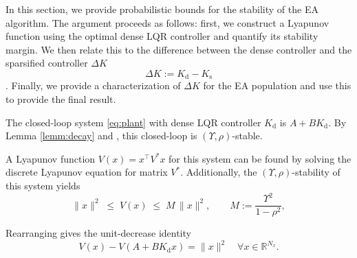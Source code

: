 \documentclass[conference]{IEEEtran}
\begin{document}
In this section, we provide probabilistic bounds for the stability of the EA algorithm. 
The argument proceeds as follows:
first, we construct a Lyapunov function using the optimal dense LQR controller and quantify its stability margin.
We then relate this to the difference between the dense controller and the sparsified controller $\Delta K$
\begin{equation}
    \Delta K := K_{\mathrm{d}} - K_{\mathrm{s}}
\end{equation}.
Finally, we provide a characterization of $\Delta K$ for the EA population and use this to provide the final result. 

The closed-loop system \eqref{eq:plant} with dense LQR controller $K_{\mathrm{d}}$ is $A+BK_{\mathrm{d}}$. By Lemma \ref{lemm:decay} and \cite[Theorem~A.7]{shin}, this closed-loop is $(\Upsilon,\rho)$-stable. %


A Lyapunov function $V(x) = x^\top V^* x$ for this system can be found by solving the discrete Lyapunov equation for matrix $V^*$. Additionally, the $(\Upsilon,\rho)$-stability of this system yields
\begin{equation}\label{eq:lyap-sandwich}
  \|x\|^{2} \;\le\; V(x) \;\le\; M\,\|x\|^{2},
  \qquad M := \frac{\Upsilon^{2}}{1 - \rho^{2}},
\end{equation}

Rearranging gives the unit-decrease
identity
\begin{equation}\label{eq:lyap-decrease}
  V(x) - V(A+BK_{\mathrm{d}} x) = \|x\|^{2} \quad \forall x \in \mathbb{R}^{N_x}.
\end{equation}

\end{document}
